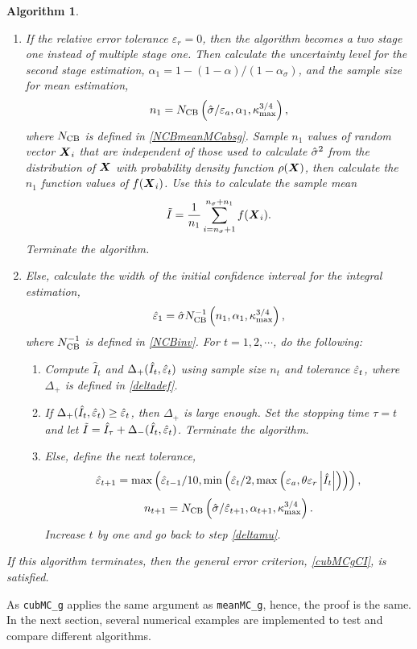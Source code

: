 \documentclass{iitthesis}
\newtheorem{algorithm}[theorem]{Algorithm}
\theoremstyle{definition}
\begin{document}
\begin{algorithm}
\begin{enumerate}
\item If the relative error tolerance $\varepsilon_r=0$, then the algorithm becomes a two stage one instead of multiple stage one. Then calculate the uncertainty level for the second stage estimation, $\alpha_1 = 1-(1-\alpha)/(1-\alpha_\sigma)$, and the sample size for mean estimation, $$n_1 = N_{\operatorname{CB}}\left(\hat{\sigma}/\varepsilon_a,\alpha_1,\kappa_{\max}^{3/4}\right),$$where $N_{\operatorname{CB}}$ is defined in \eqref{NCBmeanMCabsg}. Sample $n_1$ values of random vector $\boldsymbol{X}_i$ that are independent of those used to calculate $\hat{\sigma}^2$ from the distribution of $\boldsymbol{X}$ with probability density function $\rho(\boldsymbol{X})$, then calculate the $n_1$ function values of $f(\boldsymbol{X}_i)$. Use this to calculate the sample mean 
\begin{align}\label{hatIcubMCg}
\tilde{I}= \frac{1}{n_1}\sum_{i = n_\sigma+1}^{n_\sigma+n_1}f(\boldsymbol{X}_i).
\end{align}
Terminate the algorithm.
\item Else, calculate the width of the initial confidence interval for the integral estimation,
\begin{align}
\hat{\varepsilon}_1=\hat{\sigma} N_{\operatorname{CB}}^{-1}\left(n_1,\alpha_1,\kappa_{\max}^{3/4}\right),
\end{align}
where $N_{\operatorname{CB}}^{-1}$ is defined in \eqref{NCBinv}. For $t = 1,2,\cdots$, do the following:
\begin{enumerate}
\item  \label{deltamucubMCg}Compute $\hat{I}_t$ and $\Delta_{+}(\hat{I}_t,\hat{\varepsilon}_t)$ using sample size $n_t$ and tolerance $\hat{\varepsilon}_t$, where $\Delta_{+}$ is defined in \eqref{deltadef}.
\item If $\Delta_{+}(\hat{I}_t,\hat{\varepsilon}_t)\geq  \hat{\varepsilon}_t$, then $\Delta_{+}$ is large enough. Set the stopping time $\tau = t$ and let $\tilde{I} = \hat{I}_{\tau}+\Delta_{-}(\hat{I}_t,\hat{\varepsilon}_t)$. Terminate the algorithm.
\item Else, define the next tolerance, $$\hat{\varepsilon}_{t+1} = \max \left ( \hat{\varepsilon}_{t-1}/10,\min\left(\hat{\varepsilon}_t/2, \max\left(\varepsilon_a,\theta\varepsilon_r\left \lvert \hat{I}_t \right \rvert\right)\right)\right),$$ $$n_{t+1} = N_{\operatorname{CB}}\left(\hat{\sigma}/\hat{\varepsilon}_{t+1},\alpha_{t+1},\kappa_{\max}^{3/4}\right).$$ Increase $t$ by one and go back to step \eqref{deltamu}. 
\end{enumerate}
\end{enumerate}
If this algorithm terminates, then the general error criterion, \eqref{cubMCgCI}, is satisfied.
\end{algorithm}
As {\tt cubMC\_g} applies the same argument as {\tt meanMC\_g}, hence, the proof is the same. In the next section, several numerical examples are implemented to test and compare different algorithms.
\end{document}
